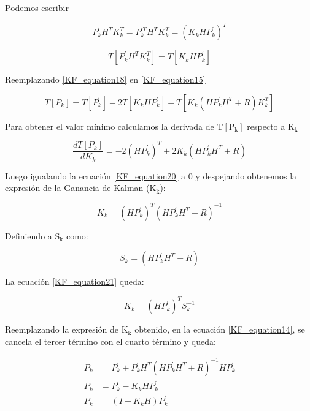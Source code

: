 \documentclass[10pt,a4paper]{article}
\begin{document}
	\noindent Podemos escribir
	
	\begin{equation}
		P^\prime_k H^T K^T_k = P^{\prime T}_k H^T K^T_k = (K_k H P^\prime_k )^T
		\label{KF_equation17}
	\end{equation}	
	
	\begin{equation}
		T[P^\prime_k H^T K^T_k] = T[K_k H P^\prime_k]
		\label{KF_equation18}
	\end{equation}	
	
	Reemplazando \ref{KF_equation18} en \ref{KF_equation15}

	\begin{equation}
		T[P_k] = T[P^\prime_k] -2 T[K_k H P^\prime_k] + T[K_k (H P^\prime_k H^T + R) K^T_k]
		\label{KF_equation19}
	\end{equation}	
	
	\noindent Para obtener el valor mínimo calculamos la derivada de 
    $\mathrm{T[P_k]}$ respecto a $\mathrm{K_k}$
	
	\begin{equation}
		\frac{dT[P_k]}{dK_k} = -2 (H P^\prime_k)^T + 2K_k (H P^\prime_k H^T + R)
		\label{KF_equation20}
	\end{equation}	
	
	\noindent Luego igualando la ecuación \ref{KF_equation20} a 0 y despejando 
    obtenemos la expresión de la Ganancia de Kalman ($\mathrm{K_k}$):
	
	\begin{equation}
		K_k = (H P^\prime_k)^T (H P^\prime_k H^T + R)^{-1} 
		\label{KF_equation21}
	\end{equation}	
	
    \noindent Definiendo a $\mathrm{S_k}$ como:
	
			\begin{equation}
				S_k = (H P^\prime_k H^T + R)
				\label{KF_equation22}
			\end{equation}	
	
	\noindent La ecuación \ref{KF_equation21} queda:
	
	\begin{equation}
		K_k = (H P^\prime_k)^T S_k^{-1} 
		\label{K_Gain}
	\end{equation}	
	
    \noindent Reemplazando la expresión de $\mathrm{K_k}$ obtenido, en la 
    ecuación  \ref{KF_equation14}, se cancela el tercer término con el cuarto 
    término y queda:
	
	\begin{align}
		P_k  &= P^\prime_k + P^\prime_k H^T (H P^\prime_k H^T + R)^{-1} H P^\prime_k \nonumber \\
		P_k  &= P^\prime_k - K_k H P^\prime_k \nonumber\\
		P_k  &= (I - K_k H) P^\prime_k	
		\label{KF_equation23}	
	\end{align}
	
\end{document}
